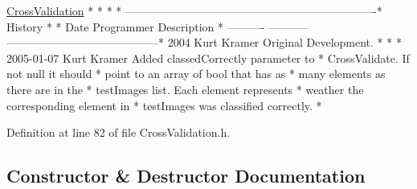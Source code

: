 \begin{DoxyCode}
                           \hyperlink{class_k_k_m_l_l_1_1_cross_validation_af4fc01fd2714d7967606ab8618815eeb}{CrossValidation}                         *
                                                                   *
                                                                   *
                                                                   *
-------------------------------------------------------------------*
  History                                                          *
                                                                   *
    Date     Programmer   Description                              *
  ---------- -----------  -----------------------------------------*
  2004       Kurt Kramer  Original Development.                    *
                                                                   *
                                                                   *
  2005-01-07 Kurt Kramer  Added classedCorrectly parameter to      *
                          CrossValidate. If not null it should     *
                          point to an array of \textcolor{keywordtype}{bool} that has as    *
                          many elements as there are in the        *
                          testImages list. Each element represents *
                          weather the corresponding element in     *
                          testImages was classified correctly.     *
\end{DoxyCode}
 

Definition at line 82 of file Cross\+Validation.\+h.



\subsection{Constructor \& Destructor Documentation}
